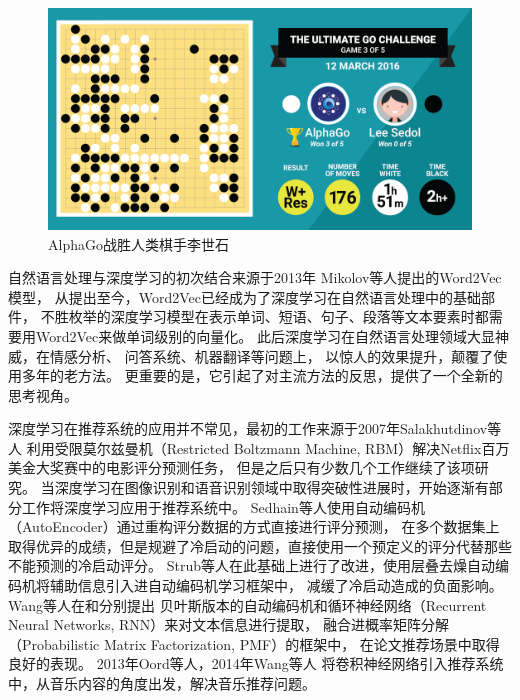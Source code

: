\begin{figure}[htbp]
\centering
\includegraphics[scale=0.22]{images/alphago.png}
\caption{AlphaGo战胜人类棋手李世石}
\label{fig:alphago}
\end{figure}

自然语言处理与深度学习的初次结合来源于2013年
Mikolov等人\parencite{mikolov2013efficient,le2014distributed,bojanowski2016enriching}提出的Word2Vec模型，
从提出至今，Word2Vec已经成为了深度学习在自然语言处理中的基础部件，
不胜枚举的深度学习模型在表示单词、短语、句子、段落等文本要素时都需要用Word2Vec来做单词级别的向量化。
此后深度学习在自然语言处理领域大显神威，在情感分析\parencite{socher2013recursive}、
问答系统\parencite{li2016deep}、机器翻译\parencite{bahdanau2014neural}等问题上，
以惊人的效果提升，颠覆了使用多年的老方法。
更重要的是，它引起了对主流方法的反思，提供了一个全新的思考视角。

深度学习在推荐系统的应用并不常见，最初的工作来源于2007年Salakhutdinov等人\parencite{salakhutdinov2007restricted}
利用受限莫尔兹曼机（Restricted Boltzmann Machine, RBM）解决Netflix百万美金大奖赛中的电影评分预测任务，
但是之后只有少数几个工作\parencite{phung2009ordinal}继续了该项研究。
当深度学习在图像识别和语音识别领域中取得突破性进展时，开始逐渐有部分工作将深度学习应用于推荐系统中。
Sedhain等人\parencite{sedhain2015autorec}使用自动编码机（AutoEncoder）通过重构评分数据的方式直接进行评分预测，
在多个数据集上取得优异的成绩，但是规避了冷启动的问题，直接使用一个预定义的评分代替那些不能预测的冷启动评分。
Strub等人\parencite{strub2016hybrid}在此基础上进行了改进，使用层叠去燥自动编码机将辅助信息引入进自动编码机学习框架中，
减缓了冷启动造成的负面影响。
Wang等人在\parencite{wang2015collaborative}和\parencite{wang2016collaborative}分别提出
贝叶斯版本的自动编码机和循环神经网络（Recurrent Neural Networks, RNN）来对文本信息进行提取，
融合进概率矩阵分解（Probabilistic Matrix Factorization, PMF）\parencite{salakhutdinov2007probabilistic}的框架中，
在论文推荐场景中取得良好的表现。
2013年Oord等人\parencite{van2013deep}，2014年Wang等人\parencite{wang2014improving}
将卷积神经网络引入推荐系统中，从音乐内容的角度出发，解决音乐推荐问题。

